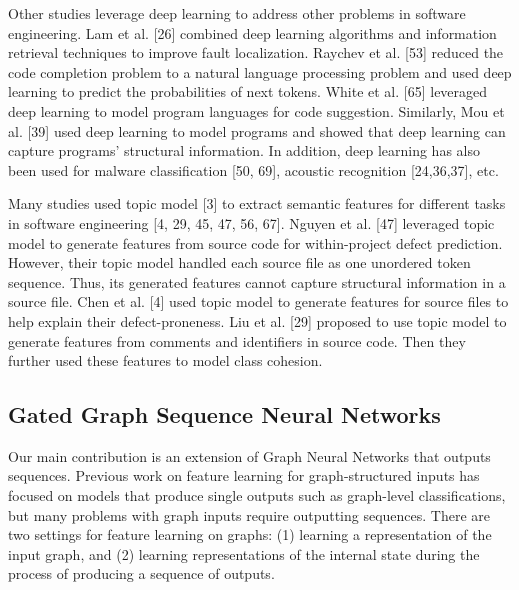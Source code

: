 \documentclass{article}
\begin{document}
Other studies leverage deep learning to address other problems in software engineering. Lam et al. [26] combined deep learning algorithms and information retrieval techniques to improve fault localization. Raychev et al. [53] reduced the code completion problem to a natural language processing problem and used deep learning to predict the probabilities of next tokens. White et al. [65] leveraged deep learning to model program languages for code suggestion. Similarly, Mou et al. [39] used deep learning to model programs and showed that deep learning can capture programs’ structural information. In addition, deep learning has also been used for malware classification [50, 69], acoustic recognition [24,36,37], etc.

Many studies used topic model [3] to extract semantic features for different tasks in software engineering [4, 29, 45, 47, 56, 67]. Nguyen et al. [47] leveraged topic model to generate features from source code for within-project defect prediction. However, their topic model handled each source file as one unordered token sequence. Thus, its generated features cannot capture structural information in a source file. Chen et al. [4] used topic model to generate features for source files to help explain their defect-proneness. Liu et al. [29] proposed to use topic model to generate features from comments and identifiers in source code. Then they further used these features to model class cohesion.
\subsection{Gated Graph Sequence Neural Networks}
Our main contribution is an extension of Graph Neural Networks that outputs sequences. Previous work on feature learning for graph-structured inputs has focused on models that produce single outputs such as graph-level classifications, but many problems with graph inputs require outputting sequences. There are two settings for feature learning on graphs: (1) learning a representation of the input graph, and (2) learning representations of the internal state during the process of producing a sequence of outputs.
\end{document}
